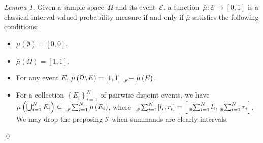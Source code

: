 \documentclass{article}
\theoremstyle{remark}
\newtheorem{lemma}{Lemma}
\newcommand{\events}{\ensuremath{\mathcal{E}}}
\newcommand{\necess}{{\mbox{\wesa{certain}}}}
\newcommand{\yutsung}[1]{\fbox{\begin{minipage}{0.9\textwidth}\color{purple}{Yu-Tsung says: #1}\end{minipage}}}
\begin{document}
\begin{lemma}\label{lem:classicalProbabilityMeasure}Given a sample
space~$\Omega$ and its event~$\events$, a function~$\bar{\mu}:\events\rightarrow[0,1]$
is a classical interval-valued probability measure if and only if
$\bar{\mu}$ satisfies the following conditions: 
\begin{itemize}
\item $\bar{\mu}(\emptyset)=[0,0]$.
\item $\bar{\mu}(\Omega)=[1,1]$. 
\item For any event $E$, $\bar{\mu}\left(\Omega\backslash E\right)=\left[1,1\right]\tensor*[_{\mathscr{I}}]{-}{}\bar{\mu}\left(E\right)$.
\item For a collection $\left\{ E_{i}\right\} _{i=1}^{N}$ of pairwise disjoint
events, we have $\bar{\mu}\left(\bigcup_{i=1}^{N}E_{i}\right)\subseteq\tensor*[_{\mathscr{I}}]{\sum}{_{i=1}^{N}}\bar{\mu}\left(E_{i}\right)$,
where $\tensor*[_{\mathscr{I}}]{\sum}{_{i=1}^{N}}[l_{i},r_{i}]=\left[\tensor*[_{\mathbb{R}}]{\sum}{_{i=1}^{N}}l_{i},\tensor*[_{\mathbb{R}}]{\sum}{_{i=1}^{N}}r_{i}\right]$.
We may drop the preposing $\mathscr{I}$ when summands are clearly
intervals. 
\end{itemize}
\qed\end{lemma}


\end{document}
